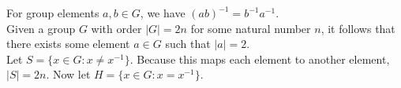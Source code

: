 \documentclass{article}
\theoremstyle{definition}
\begin{document}
  For group elements $a,b\in G$, we have $(ab)^{-1} = b^{-1}a^{-1}$.\\
 
 
  Given a group $G$ with order $|G| = 2n$ for some natural number $n$, it follows that there exists some element $a\in G$ such that $|a| = 2$.\\
 
  Let $S =\{x\in G : x \ne x^{-1}\}$. Because this maps each element to another element, $|S| = 2n$. Now let $H = \{x\in G: x = x^{-1}\}.$ 
 
\end{document}
